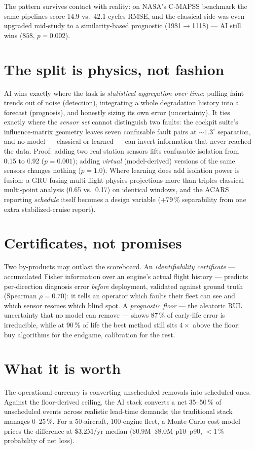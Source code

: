 \documentclass[11pt,twocolumn]{article}
\begin{document}
The pattern survives contact with reality: on NASA's C-MAPSS benchmark the same pipelines
score 14.9 vs.\ 42.1 cycles RMSE, and the classical side was even upgraded mid-study to a
similarity-based prognostic (1981${\to}$1118) --- AI still wins ($858$, $p{=}0.002$).

\section{The split is physics, not fashion}
AI wins exactly where the task is \emph{statistical aggregation over time}: pulling faint
trends out of noise (detection), integrating a whole degradation history into a forecast
(prognosis), and honestly sizing its own error (uncertainty). It ties exactly where the
\emph{sensor set} cannot distinguish two faults: the cockpit suite's influence-matrix
geometry leaves seven confusable fault pairs at ${\sim}1.3^{\circ}$ separation, and no model
--- classical or learned --- can invert information that never reached the data. Proof:
adding two real station sensors lifts confusable isolation from 0.15 to 0.92
($p{=}0.001$); adding \emph{virtual} (model-derived) versions of the same sensors changes
nothing ($p{=}1.0$). Where learning does add isolation power is fusion: a GRU fusing
multi-flight physics projections more than triples classical multi-point analysis (0.65
vs.\ 0.17) on identical windows, and the ACARS reporting \emph{schedule} itself becomes a
design variable (+79\,\% separability from one extra stabilized-cruise report).

\section{Certificates, not promises}
Two by-products may outlast the scoreboard. An \emph{identifiability certificate} ---
accumulated Fisher information over an engine's actual flight history --- predicts
per-direction diagnosis error \emph{before} deployment, validated against ground truth
(Spearman $\rho{=}0.70$): it tells an operator which faults their fleet can see and which
sensor rescues which blind spot. A \emph{prognostic floor} --- the aleatoric RUL
uncertainty that no model can remove --- shows 87\,\% of early-life error is irreducible,
while at 90\,\% of life the best method still sits $4\times$ above the floor: buy
algorithms for the endgame, calibration for the rest.

\section{What it is worth}
The operational currency is converting unscheduled removals into scheduled ones. Against
the floor-derived ceiling, the AI stack converts a net 35--50\,\% of unscheduled events
across realistic lead-time demands; the traditional stack manages 0--25\,\%. For a
50-aircraft, 100-engine fleet, a Monte-Carlo cost model prices the difference at
\$3.2M/yr median (\$0.9M--\$8.0M p10--p90, ${<}1\,\%$ probability of net loss).
\end{document}
